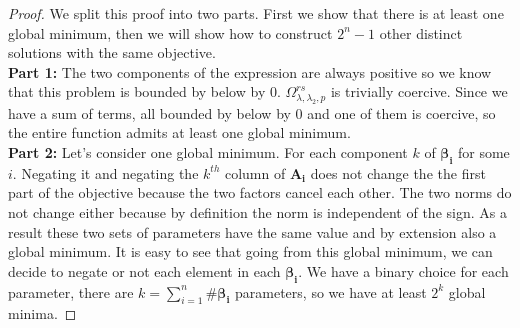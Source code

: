 \begin{proof}
  We  split this proof into two parts. First we show that there is at least
  one global minimum, then we will show how to construct $2^n - 1$ other distinct
  solutions with the same objective.
\\ \textbf{Part 1:}
The two components of the expression are always positive so we know that this problem is bounded by below by $0$. $\Omega_{\lambda, \lambda_2, p}^{rs}$ is trivially coercive. Since we have a sum of terms, all bounded by below by $0$ and one of them is coercive, so the entire function admits at least one global minimum.
\\ \textbf{Part 2:} Let's consider one global minimum. For each component $k$ of $\bm{\beta_i}$ for some $i$. Negating it and negating the $k^{th}$ column of $\bm{A_i}$ does not change the the first part of the objective because the two factors cancel each other. The two norms do not change either because by definition the norm is independent of the sign. As a result these two sets of parameters have the same value and by extension also a global minimum. It is easy to see that going from this global minimum, we can decide to negate or not each element in each $\bm{\beta_i}$. We have a binary choice for each parameter, there are $k = \sum_{i=1}^n \#\bm{\beta_i}$ parameters, so we have at least $2^k$ global minima.

\end{proof}

%
%



